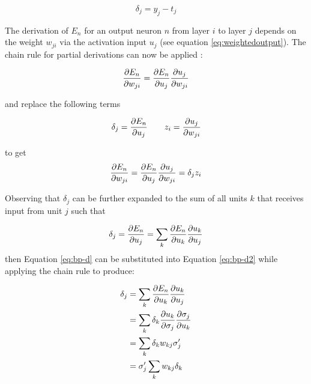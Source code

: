 \documentclass[report.tex]{subfiles}
\begin{document}
\begin{equation}
  \delta_j = y_j - t_j
  \label{eq:bp-loss-prime}
\end{equation}

The derivation of $E_n$ for an output neuron $n$ from layer $i$ to layer $j$
depends on the weight $w_{ji}$ via the activation input $u_j$ (see equation
\ref{eq:weightedoutput}).
The chain rule for partial derivations can now be applied \cite{Bishop2006}:

\begin{equation}
  {\partial E_n \over \partial w_{ji} } =
  { \partial E_n \over \partial u_j}
  {\partial u_j \over \partial w_{ji}}
  \label{eq:bp-chain}
\end{equation}

\noindent and replace the following terms

\begin{equation}
  \delta_j = 
  { \partial E_n \over \partial u_j}
  \qquad
  z_i = { \partial u_j \over \partial w_{ji}}
  \label{eq:bp-d}
\end{equation}

\noindent to get 
\begin{equation}
  {\partial E_n \over \partial w_{ji} } =
  { \partial E_n \over \partial u_j}
  {\partial u_j \over \partial w_{ji}} = 
  \delta_j z_i
  \label{eq:bp-chain2}
\end{equation}

Observing that $\delta_j$ can be further expanded to the sum of all units $k$
that receives input from unit $j$ such that

\begin{equation}
  \delta_j = {\partial E_n \over \partial u_j} =
  \sum_k {\partial E_n \over \partial u_k} 
  {\partial u_k \over \partial u_j}
  \label{eq:bp-d2}
\end{equation}
\noindent
then Equation \ref{eq:bp-d} can be substituted into Equation \ref{eq:bp-d2}
while applying the chain rule to produce:

\begin{equation}
  \begin{split}
  \delta_j & = \sum_k {\partial E_n \over \partial u_k} 
   {\partial u_k \over \partial u_j} \\
   & = \sum_k \delta_k {\partial u_k \over \partial \sigma_j} {\partial \sigma_j \over \partial u_k} \\
   & = \sum_k \delta_k w_{kj} \sigma'_j \\
   & = \sigma'_j \sum_k w_{kj} \delta_k 
  \end{split}
  \label{eq:bp}
\end{equation}
\end{document}
